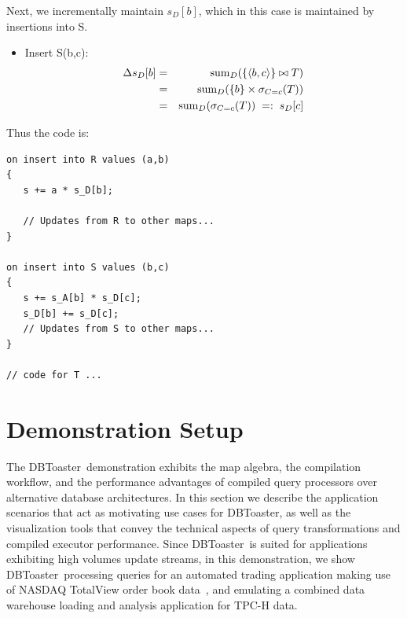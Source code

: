 \documentclass{vldb}
\newcommand{\tuple}[1]{{\langle#1\rangle}}
\newcommand{\compiler}{DBToaster}
\begin{document}
 
Next, we incrementally maintain $s_D[b]$, which in this case is maintained by
insertions into S.

\begin{itemize}
\item
Insert S(b,c):
\begin{eqnarray*}
\Delta s_D[b] &=&
\algsum_{D}(\{\tuple{b,c}\} \bowtie T)
\\ &=&
\algsum_{D}(\{b\} \times \sigma_{C=c}(T))
\\ &=&
\algsum_{D}(\sigma_{C=c}(T))
\;=:\; s_D[c]
\end{eqnarray*}
\end{itemize}

Thus the code is:
\begin{verbatim}
on insert into R values (a,b)
{
   s += a * s_D[b];

   // Updates from R to other maps...
}

on insert into S values (b,c)
{
   s += s_A[b] * s_D[c];
   s_D[b] += s_D[c];
   // Updates from S to other maps...
}

// code for T ...
\end{verbatim}



\section{Demonstration Setup}
The \compiler\ demonstration exhibits the map algebra, the compilation workflow,
and the performance advantages of compiled query processors over alternative
database architectures. In this section we describe the application scenarios
that act as motivating use cases for \compiler, as well as the visualization
tools that convey the technical aspects of query transformations and compiled
executor performance.
Since \compiler\ is suited for applications exhibiting high volumes update
streams, in this demonstration, we show \compiler\ processing queries for an
automated trading application making use of NASDAQ TotalView order book
data~\cite{totalview-url}, and emulating a combined data warehouse loading and
analysis application for TPC-H data. 
\end{document}

